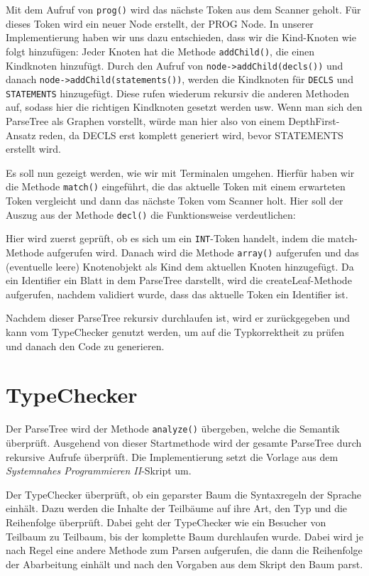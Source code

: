 Mit dem Aufruf von \texttt{prog()} wird das nächste Token aus dem Scanner geholt. Für dieses Token wird ein neuer Node erstellt, der PROG Node. In unserer Implementierung haben wir uns dazu entschieden, dass wir die Kind-Knoten wie folgt hinzufügen:
Jeder Knoten hat die Methode \texttt{addChild()}, die einen Kindknoten hinzufügt. Durch den Aufruf von \texttt{node->addChild(decls())} und danach \texttt{node->addChild(statements())}, werden die Kindknoten für \texttt{DECLS} und \texttt{STATEMENTS} hinzugefügt. Diese rufen wiederum rekursiv die anderen Methoden auf, sodass hier die richtigen Kindknoten gesetzt werden usw. Wenn man sich den ParseTree als Graphen vorstellt, würde man hier also von einem DepthFirst-Ansatz reden, da DECLS erst komplett generiert wird, bevor STATEMENTS erstellt wird.

Es soll nun gezeigt werden, wie wir mit Terminalen umgehen. Hierfür haben wir die Methode \texttt{match()} eingeführt, die das aktuelle Token mit einem erwarteten Token vergleicht und dann das nächste Token vom Scanner holt. Hier soll der Auszug aus der Methode \texttt{decl()} die Funktionsweise verdeutlichen:



Hier wird zuerst geprüft, ob es sich um ein \texttt{INT}-Token handelt, indem die match-Methode aufgerufen wird. Danach wird die Methode \texttt{array()} aufgerufen und das (eventuelle leere) Knotenobjekt als Kind dem aktuellen Knoten hinzugefügt. Da ein Identifier ein Blatt in dem ParseTree darstellt, wird die createLeaf-Methode aufgerufen, nachdem validiert wurde, dass das aktuelle Token ein Identifier ist.

Nachdem dieser ParseTree rekursiv durchlaufen ist, wird er zurückgegeben und kann vom TypeChecker genutzt werden, um auf die Typkorrektheit zu prüfen und danach den Code zu generieren.


\section{TypeChecker}
Der ParseTree wird der Methode \texttt{analyze()} übergeben, welche die Semantik überprüft. Ausgehend von dieser Startmethode wird der gesamte ParseTree durch rekursive Aufrufe überprüft. Die Implementierung setzt die Vorlage aus dem \emph{Systemnahes Programmieren II}-Skript um.

Der TypeChecker überprüft, ob ein geparster Baum die Syntaxregeln der Sprache einhält. Dazu werden die Inhalte der Teilbäume auf ihre Art, den Typ und die Reihenfolge überprüft. Dabei geht der TypeChecker wie ein Besucher von Teilbaum zu Teilbaum, bis der komplette Baum durchlaufen wurde.
Dabei wird je nach Regel eine andere Methode zum Parsen aufgerufen, die dann die Reihenfolge der Abarbeitung einhält und nach den Vorgaben aus dem Skript den Baum parst.

